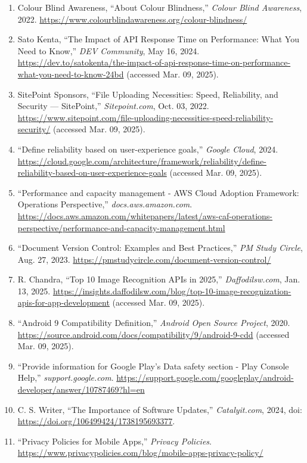 \documentclass{article}
\begin{document}
\begin{enumerate}
    \item Colour Blind Awareness, “About Colour Blindness,” \textit{Colour Blind Awareness}, 2022. \url{https://www.colourblindawareness.org/colour-blindness/}
    \item Sato Kenta, “The Impact of API Response Time on Performance: What You Need to Know,” \textit{DEV Community}, May 16, 2024. \url{https://dev.to/satokenta/the-impact-of-api-response-time-on-performance-what-you-need-to-know-24bd} (accessed Mar. 09, 2025).
    \item SitePoint Sponsors, “File Uploading Necessities: Speed, Reliability, and Security — SitePoint,” \textit{Sitepoint.com}, Oct. 03, 2022. \url{https://www.sitepoint.com/file-uploading-necessities-speed-reliability-security/} (accessed Mar. 09, 2025).
    \item “Define reliability based on user-experience goals,” \textit{Google Cloud}, 2024. \url{https://cloud.google.com/architecture/framework/reliability/define-reliability-based-on-user-experience-goals} (accessed Mar. 09, 2025).
    \item “Performance and capacity management - AWS Cloud Adoption Framework: Operations Perspective,” \textit{docs.aws.amazon.com}. \url{https://docs.aws.amazon.com/whitepapers/latest/aws-caf-operations-perspective/performance-and-capacity-management.html}
    \item “Document Version Control: Examples and Best Practices,” \textit{PM Study Circle}, Aug. 27, 2023. \url{https://pmstudycircle.com/document-version-control/}
    \item R. Chandra, “Top 10 Image Recognition APIs in 2025,” \textit{Daffodilsw.com}, Jan. 13, 2025. \url{https://insights.daffodilsw.com/blog/top-10-image-recognization-apis-for-app-development} (accessed Mar. 09, 2025).
    \item “Android 9 Compatibility Definition,” \textit{Android Open Source Project}, 2020. \url{https://source.android.com/docs/compatibility/9/android-9-cdd} (accessed Mar. 09, 2025).
    \item “Provide information for Google Play’s Data safety section - Play Console Help,” \textit{support.google.com}. \url{https://support.google.com/googleplay/android-developer/answer/10787469?hl=en}
    \item C. S. Writer, “The Importance of Software Updates,” \textit{Catalyit.com}, 2024, doi: \url{https://doi.org/106499424/1738195693377}.
    \item “Privacy Policies for Mobile Apps,” \textit{Privacy Policies}. \url{https://www.privacypolicies.com/blog/mobile-apps-privacy-policy/}

\end{enumerate}
\end{document}
